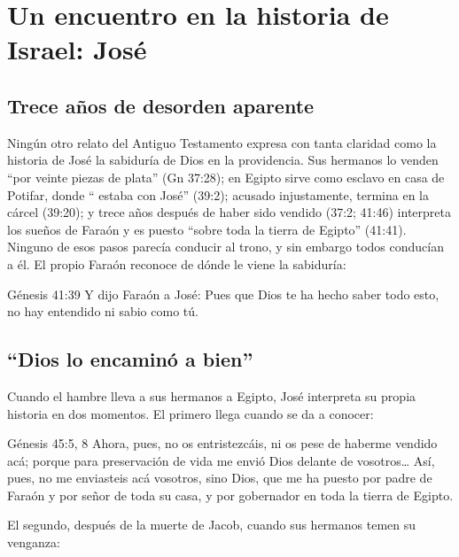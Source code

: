 \section{Un encuentro en la historia de Israel: José}

\subsection{Trece años de desorden aparente}

Ningún otro relato del Antiguo Testamento expresa con tanta claridad como la historia de José la sabiduría de Dios en la providencia. Sus hermanos lo venden ``por veinte piezas de plata'' (Gn 37:28); en Egipto sirve como esclavo en casa de Potifar, donde ``\SENOR{} estaba con José'' (39:2); acusado injustamente, termina en la cárcel (39:20); y trece años después de haber sido vendido (37:2; 41:46) interpreta los sueños de Faraón y es puesto ``sobre toda la tierra de Egipto'' (41:41). Ninguno de esos pasos parecía conducir al trono, y sin embargo todos conducían a él. El propio Faraón reconoce de dónde le viene la sabiduría:

\begin{verso}{Génesis 41:39}
Y dijo Faraón a José: Pues que Dios te ha hecho saber todo esto, no hay entendido ni sabio como tú.
\end{verso}

\subsection{“Dios lo encaminó a bien”}

Cuando el hambre lleva a sus hermanos a Egipto, José interpreta su propia historia en dos momentos. El primero llega cuando se da a conocer:

\begin{verso}{Génesis 45:5, 8}
Ahora, pues, no os entristezcáis, ni os pese de haberme vendido acá; porque para preservación de vida me envió Dios delante de vosotros\ldots{} Así, pues, no me enviasteis acá vosotros, sino Dios, que me ha puesto por padre de Faraón y por señor de toda su casa, y por gobernador en toda la tierra de Egipto.
\end{verso}

El segundo, después de la muerte de Jacob, cuando sus hermanos temen su venganza:

